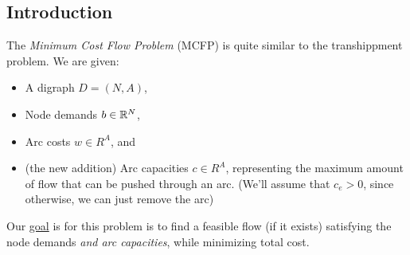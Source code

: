 
\subsection{Introduction}
The \textit{Minimum Cost Flow Problem} (MCFP) is quite similar to the transhippment problem. 
We are given:
\begin{itemize}
    \item A digraph $D = (N,A)$,
    \item Node demands $b \in \mathbb{R}^N$, 
    \item Arc costs $w \in R^A$, and
    \item (the new addition) Arc capacities $c \in R^A$, representing the maximum amount of flow that can be pushed through an arc. (We'll assume that $c_e > 0$, since otherwise, we can just remove the arc)
\end{itemize}

Our \underline{goal} is for this problem is to find a feasible flow (if it exists) satisfying the node demands \textit{and arc capacities}, while minimizing total cost.

